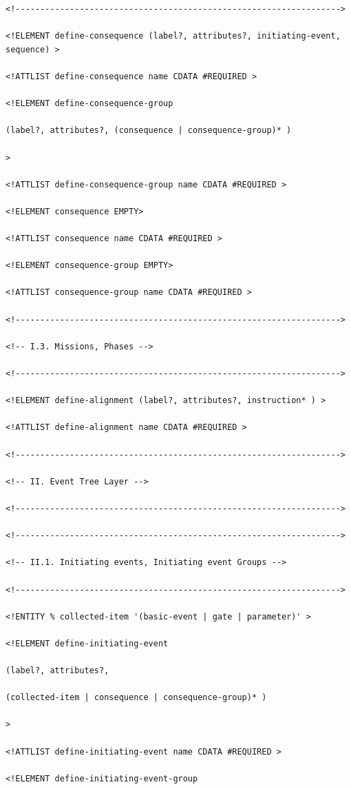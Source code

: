 \documentclass[11pt]{article}
\begin{document}
\begin{lstlisting}
<!------------------------------------------------------------------>

<!ELEMENT define-consequence (label?, attributes?, initiating-event,
sequence) >

<!ATTLIST define-consequence name CDATA #REQUIRED >

<!ELEMENT define-consequence-group

(label?, attributes?, (consequence | consequence-group)* )

>

<!ATTLIST define-consequence-group name CDATA #REQUIRED >

<!ELEMENT consequence EMPTY>

<!ATTLIST consequence name CDATA #REQUIRED >

<!ELEMENT consequence-group EMPTY>

<!ATTLIST consequence-group name CDATA #REQUIRED >

<!------------------------------------------------------------------>

<!-- I.3. Missions, Phases -->

<!------------------------------------------------------------------>

<!ELEMENT define-alignment (label?, attributes?, instruction* ) >

<!ATTLIST define-alignment name CDATA #REQUIRED >

<!------------------------------------------------------------------>

<!-- II. Event Tree Layer -->

<!------------------------------------------------------------------>

<!------------------------------------------------------------------>

<!-- II.1. Initiating events, Initiating event Groups -->

<!------------------------------------------------------------------>

<!ENTITY % collected-item '(basic-event | gate | parameter)' >

<!ELEMENT define-initiating-event

(label?, attributes?,

(collected-item | consequence | consequence-group)* )

>

<!ATTLIST define-initiating-event name CDATA #REQUIRED >

<!ELEMENT define-initiating-event-group


\end{lstlisting}
\end{document}

